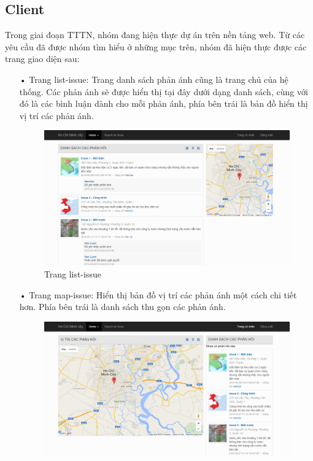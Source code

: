 \documentclass[a4paper]{article}
\begin{document}
\subsection{Client}
Trong giai đoạn TTTN, nhóm đang hiện thực dự án trên nền tảng web. Từ các yêu cầu đã được nhóm tìm hiểu ở những mục trên, nhóm đã hiện thực được các trang giao diện sau:
\begin{itemize}
	\item[•]Trang list-issue: Trang danh sách phản ánh cũng là trang chủ của hệ thống. Các phản ánh sẽ được hiển thị tại đây dưới dạng danh sách, cùng với đó là các bình luận dành cho mỗi phản ánh, phía bên trái là bản đồ hiển thị vị trí các phản ánh.
	\begin{center}
    	\begin{figure}[htp]
    	\begin{center}
    	 	\includegraphics[scale=.4]{list-issue.PNG}
    	\end{center}
    	\caption{Trang list-issue}
    	\label{refhinh1}
    	\end{figure}
    \end{center}
	\item[•]Trang map-issue: Hiển thị bản đồ vị trí các phản ánh một cách chi tiết hơn. Phía bên trái là danh sách thu gọn các phản ánh.
	\begin{center}
    	\begin{figure}[htp]
    	\begin{center}
    	 	\includegraphics[scale=.4]{map-issue.PNG}

\end{center}
\end{figure}
\end{center}
\end{itemize}
\end{document}
